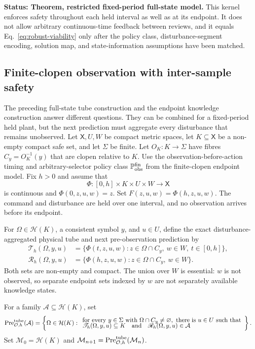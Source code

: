 \documentclass[11pt]{article}
\theoremstyle{definition}
\newcommand{\Pre}{\operatorname{Pre}}
\newcommand{\status}[1]{\par\smallskip\noindent\textbf{Status: #1.}\quad}
\begin{document}
\status{Theorem, restricted fixed-period full-state model} This kernel enforces safety throughout each held interval as well as at its endpoint. It does not allow arbitrary continuous-time feedback between reviews, and it equals Eq.~\eqref{eq:robust-viability} only after the policy class, disturbance-segment encoding, solution map, and state-information assumptions have been matched.

\subsection{Finite-clopen observation with inter-sample safety}

The preceding full-state tube construction and the endpoint knowledge construction answer different questions.  They can be combined for a fixed-period held plant, but the next prediction must aggregate every disturbance that remains unobserved.  Let $\mathsf X,U,W$ be compact metric spaces, let $K\subseteq \mathsf X$ be a non-empty
compact safe set, and let $\Sigma$ be finite.  Let $O_K:K\to \Sigma$ have fibres
$C_y=O_K^{-1}(y)$ that are clopen relative to $K$.  Use the
observation-before-action timing and arbitrary-selector policy class
$\mathbb P_{\rm obs}^{\rm fin}$ from the finite-clopen endpoint model.  Fix $h>0$ and assume that
\[
\Phi:[0,h]\times K\times U\times W\longrightarrow \mathsf X
\]
is continuous and $\Phi(0,z,u,w)=z$.  Set
$F(z,u,w)=\Phi(h,z,u,w)$.  The command and disturbance are held over one
interval, and no observation arrives before its endpoint.

For $\Omega\in\mathcal H(K)$, a consistent symbol $y$, and $u\in U$, define the exact disturbance-aggregated physical tube and next pre-observation prediction by
\begin{align*}
\mathscr T_h(\Omega,y,u)
&=\{\Phi(t,z,u,w):z\in\Omega\cap C_y,\ w\in W,\ t\in[0,h]\},\\
\mathscr R_h(\Omega,y,u)
&=\{\Phi(h,z,u,w):z\in\Omega\cap C_y,\ w\in W\}.
\end{align*}
Both sets are non-empty and compact.  The union over $W$ is essential: $w$ is not observed, so separate endpoint sets indexed by $w$ are not separately available knowledge states.

For a family $\mathcal A\subseteq\mathcal H(K)$, set
\begin{equation}
\Pre_{\mathcal O,h}^{\rm tube}(\mathcal A)
=\left\{\Omega\in\mathcal H(K):
\begin{array}{l}
\text{for every }y\in \Sigma\text{ with }\Omega\cap C_y\ne\varnothing,
\text{ there is }u\in U\text{ such that}\\[-1mm]
\mathscr T_h(\Omega,y,u)\subseteq K
\quad\text{and}\quad
\mathscr R_h(\Omega,y,u)\in\mathcal A
\end{array}\right\}.
\label{eq:finite-observation-tube-predecessor}
\end{equation}
Set $\mathcal M_0=\mathcal H(K)$ and
$\mathcal M_{n+1}=\Pre_{\mathcal O,h}^{\rm tube}(\mathcal M_n)$.
\end{document}

